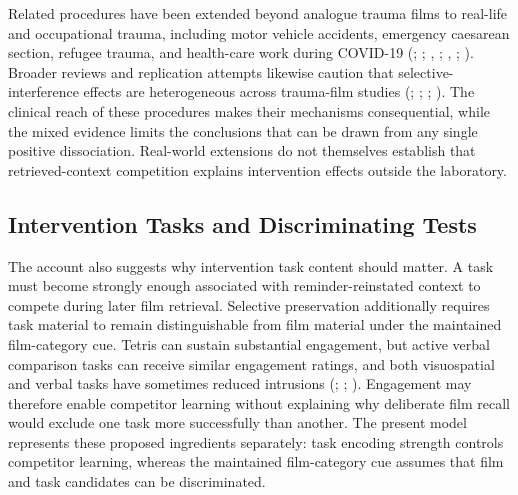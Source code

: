 \documentclass[
  man,
  floatsintext,
  longtable,
  nolmodern,
  notxfonts,
  notimes,
  draftfirst,
  colorlinks=true,linkcolor=blue,citecolor=blue,urlcolor=blue]{apa7}
\begin{document}
Related procedures have been extended beyond analogue trauma films to
real-life and occupational trauma, including motor vehicle accidents,
emergency caesarean section, refugee trauma, and health-care work during
COVID-19 (; ;
,
;
,
;
). Broader
reviews and replication attempts likewise caution that
selective-interference effects are heterogeneous across trauma-film
studies (; ;
;
). The clinical
reach of these procedures makes their mechanisms consequential, while
the mixed evidence limits the conclusions that can be drawn from any
single positive dissociation. Real-world extensions do not themselves
establish that retrieved-context competition explains intervention
effects outside the laboratory.

\subsection{Intervention Tasks and Discriminating
Tests}\label{intervention-tasks-and-discriminating-tests}

The account also suggests why intervention task content should matter. A
task must become strongly enough associated with reminder-reinstated
context to compete during later film retrieval. Selective preservation
additionally requires task material to remain distinguishable from film
material under the maintained film-category cue. Tetris can sustain
substantial engagement, but active verbal comparison tasks can receive
similar engagement ratings, and both visuospatial and verbal tasks have
sometimes reduced intrusions
(;
;
).
Engagement may therefore enable competitor learning without explaining
why deliberate film recall would exclude one task more successfully than
another. The present model represents these proposed ingredients
separately: task encoding strength controls competitor learning, whereas
the maintained film-category cue assumes that film and task candidates
can be discriminated.
\end{document}
